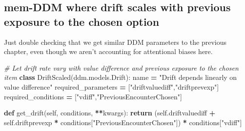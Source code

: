 \documentclass[
]{book}
\newenvironment{Shaded}{\begin{snugshade}}{\end{snugshade}}
\newcommand{\CommentTok}[1]{\textcolor[rgb]{0.56,0.35,0.01}{\textit{#1}}}
\newcommand{\ControlFlowTok}[1]{\textcolor[rgb]{0.13,0.29,0.53}{\textbf{#1}}}
\newcommand{\KeywordTok}[1]{\textcolor[rgb]{0.13,0.29,0.53}{\textbf{#1}}}
\newcommand{\NormalTok}[1]{#1}
\newcommand{\OperatorTok}[1]{\textcolor[rgb]{0.81,0.36,0.00}{\textbf{#1}}}
\newcommand{\StringTok}[1]{\textcolor[rgb]{0.31,0.60,0.02}{#1}}
\newcommand{\VariableTok}[1]{\textcolor[rgb]{0.00,0.00,0.00}{#1}}
\begin{document}
\hypertarget{mem-ddm-where-drift-scales-with-previous-exposure-to-the-chosen-option}{%
\subsection{mem-DDM where drift scales with previous exposure to the chosen option}\label{mem-ddm-where-drift-scales-with-previous-exposure-to-the-chosen-option}}

Just double checking that we get similar DDM parameters to the previous chapter, even though we aren't accounting for attentional biases here.

\begin{Shaded}
\begin{Highlighting}[]
\CommentTok{\# Let drift rate vary with value difference and previous exposure to the chosen item}
\KeywordTok{class}\NormalTok{ DriftScaled(ddm.models.Drift):}
\NormalTok{  name }\OperatorTok{=} \StringTok{"Drift depends linearly on value difference"}
\NormalTok{  required\_parameters }\OperatorTok{=}\NormalTok{ [}\StringTok{"driftvaluediff"}\NormalTok{,}\StringTok{"driftprevexp"}\NormalTok{]}
\NormalTok{  required\_conditions }\OperatorTok{=}\NormalTok{ [}\StringTok{"vdiff"}\NormalTok{,}\StringTok{"PreviousEncounterChosen"}\NormalTok{]}
  
  \KeywordTok{def}\NormalTok{ get\_drift(}\VariableTok{self}\NormalTok{, conditions, }\OperatorTok{**}\NormalTok{kwargs):}
    \ControlFlowTok{return}\NormalTok{ (}\VariableTok{self}\NormalTok{.driftvaluediff }\OperatorTok{+} \VariableTok{self}\NormalTok{.driftprevexp }\OperatorTok{*}\NormalTok{ conditions[}\StringTok{"PreviousEncounterChosen"}\NormalTok{]) }\OperatorTok{*}\NormalTok{ conditions[}\StringTok{"vdiff"}\NormalTok{]}


\end{Highlighting}
\end{Shaded}
\end{document}

